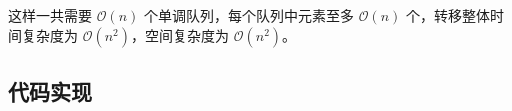 这样一共需要 \(\mathcal{O}(n)\) 个单调队列，每个队列中元素至多
\(\mathcal{O}(n)\) 个，转移整体时间复杂度为
\(\mathcal{O}(n^2)\)，空间复杂度为 \(\mathcal{O}(n^2)\)。

\subsection{代码实现}

\inputminted[frame=lines, numbers=left, fontsize=\scriptsize, tabsize=4, breaklines=true]{c++}{code/5.cpp}













